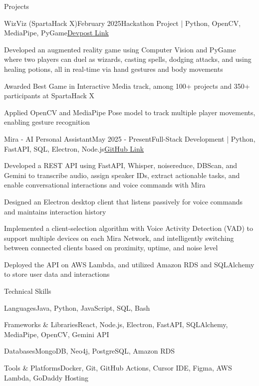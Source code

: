 \documentclass[
	11pt
]{resume}
\begin{document}
	\begin{rSection}{P}{rojects}
		\begin{rSectionEntry}{WizViz (SpartaHack X)}{February 2025}{Hackathon Project | Python, OpenCV, MediaPipe, PyGame}{\href{https://devpost.com/software/wizviz}{Devpost Link}}
			\item Developed an augmented reality game using Computer Vision and PyGame where two players can duel as wizards, casting spells, dodging attacks, and using healing potions, all in real-time via hand gestures and body movements
			\item Awarded Best Game in Interactive Media track, among 100+ projects and 350+ participants at SpartaHack X
			\item Applied OpenCV and MediaPipe Pose model to track multiple player movements, enabling gesture recognition
		\end{rSectionEntry}

		\begin{rSectionEntry}{Mira - AI Personal Assistant}{May 2025 - Present}{Full-Stack Development | Python, FastAPI, SQL, Electron, Node.js}{\href{https://github.com/mira-assistant}{GitHub Link}}
			\item Developed a REST API using FastAPI, Whisper, noisereduce, DBScan, and Gemini to transcribe audio, assign speaker IDs, extract actionable tasks, and enable conversational interactions and voice commands with Mira
			\item Designed an Electron desktop client that listens passively for voice commands and maintains interaction history
			\item Implemented a client-selection algorithm with Voice Activity Detection (VAD) to support multiple devices on each Mira Network, and intelligently switching between connected clients based on proximity, uptime, and noise level
			\item Deployed the API on AWS Lambda, and utilized Amazon RDS and SQLAlchemy to store user data and interactions
		\end{rSectionEntry}
	\end{rSection}

	\begin{rSection}{T}{echnical Skills}
		\begin{rSet}{Languages}{Java, Python, JavaScript, SQL, Bash}
		\end{rSet}
		\begin{rSet}{Frameworks \& Libraries}{React, Node.js, Electron, FastAPI, SQLAlchemy, MediaPipe, OpenCV, Gemini API}
		\end{rSet}
		\begin{rSet}{Databases}{MongoDB, Neo4j, PostgreSQL, Amazon RDS}
		\end{rSet}
		\begin{rSet}{Tools \& Platforms}{Docker, Git, GitHub Actions, Cursor IDE, Figma, AWS Lambda, GoDaddy Hosting}
		\end{rSet}
	\end{rSection}
\end{document}
